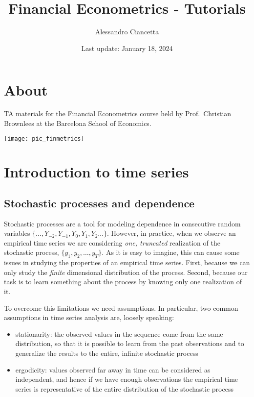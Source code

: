 \documentclass[
]{book}
\title{Financial Econometrics - Tutorials}
\author{Alessandro Ciancetta}
\date{Last update: January 18, 2024}
\begin{document}
\maketitle

{
\setcounter{tocdepth}{1}
\tableofcontents
}
\hypertarget{about}{%
\chapter*{About}\label{about}}

TA materials for the Financial Econometrics course held by Prof.~Christian Brownlees at the Barcelona School of Economics.

\begin{center}\texttt{[image: pic\_finmetrics]} \end{center}

\hypertarget{session01}{%
\chapter{Introduction to time series}\label{session01}}

\hypertarget{stochastic-processes-and-dependence}{%
\section{Stochastic processes and dependence}\label{stochastic-processes-and-dependence}}

Stochastic processes are a tool for modeling dependence in consecutive random variables \(\{\dots, Y_{-2}, Y_{-1}, Y_{0}, Y_{1}, Y_{2} \dots\}\). However, in practice, when we observe an empirical time series we are considering \emph{one, truncated} realization of the stochastic process, \(\{y_1, y_2, \dots, y_T\}\). As it is easy to imagine, this can cause some issues in studying the properties of an empirical time series. First, because we can only study the \emph{finite} dimensional distribution of the process. Second, because our task is to learn something about the process by knowing only one realization of it.

To overcome this limitations we need assumptions. In particular, two common assumptions in time series analysis are, loosely speaking:

\begin{itemize}
\item
  stationarity: the observed values in the sequence come from the same distribution, so that it is possible to learn from the past observations and to generalize the results to the entire, infinite stochastic process
\item
  ergodicity: values observed far away in time can be considered as independent, and hence if we have enough observations the empirical time series is representative of the entire distribution of the stochastic process
\end{itemize}
\end{document}
